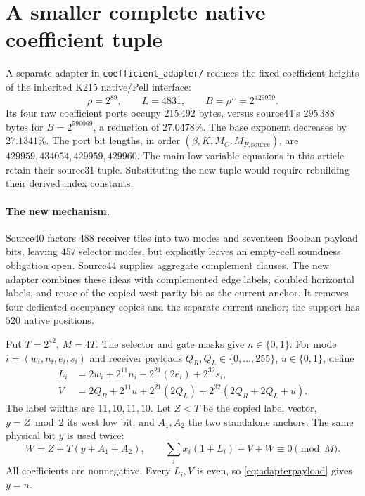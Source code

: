 \section{A smaller complete native coefficient tuple}
\label{app:coefficient-adapter}

A separate adapter in \texttt{coefficient\_adapter/} reduces the fixed
coefficient heights of the inherited K215 native/Pell interface:
\[
 \rho=2^{89},\qquad L=4831,\qquad B=\rho^L=2^{429959}.
\]
Its four raw coefficient ports occupy \(215\,492\) bytes, versus
source44's \(295\,388\) bytes for \(B=2^{590069}\), a reduction of
\(27.0478\%\). The base exponent decreases by \(27.1341\%\).
The port bit lengths, in order
\((\beta,K,M_C,M_{F,\mathrm{source}})\), are
\(429959,434054,429959,429960\).
The main low-variable equations in this article retain their source31
tuple. Substituting the new tuple would require rebuilding their
derived index constants.

\paragraph{The new mechanism.}
Source40 factors \(488\) receiver tiles into two modes and seventeen
Boolean payload bits, leaving \(457\) selector modes, but explicitly
leaves an empty-cell soundness obligation open. Source44 supplies
aggregate complement clauses. The new adapter combines these ideas
with complemented edge labels, doubled horizontal labels, and reuse
of the copied west parity bit as the current anchor. It removes four
dedicated occupancy copies and the separate current anchor; the support
has \(520\) native positions.

Put \(T=2^{42}\), \(M=4T\). The selector and gate masks give
\(n\in\{0,1\}\). For mode \(i=(w_i,n_i,e_i,s_i)\) and receiver payloads
\(Q_R,Q_L\in\{0,\ldots,255\}\), \(u\in\{0,1\}\), define
\[
 \begin{aligned}
 L_i&=2w_i+2^{11}n_i+2^{21}(2e_i)+2^{32}s_i,\\
 V&=2Q_R+2^{11}u+2^{21}(2Q_L)+2^{32}(2Q_R+2Q_L+u).
 \end{aligned}
\]
The label widths are \(11,10,11,10\). Let \(Z<T\) be the copied label
vector, \(y=Z\bmod2\) its west low bit, and \(A_1,A_2\) the two
standalone anchors. The same physical bit \(y\) is used twice:
\begin{equation}
 W=Z+T(y+A_1+A_2),\qquad
 \sum_i x_i(1+L_i)+V+W\equiv0\pmod M.                 \label{eq:adapterpayload}
\end{equation}
All coefficients are nonnegative. Every \(L_i,V\) is even, so \eqref{eq:adapterpayload}
gives \(y=n\).


